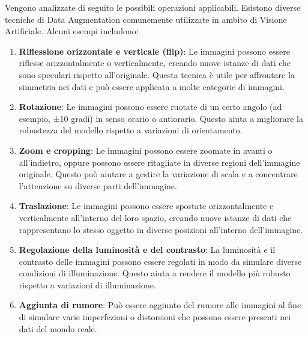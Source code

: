 \documentclass[12pt,a4paper,openright,twoside]{book}
\begin{document}
Vengono analizzate di seguito le possibili operazioni applicabili. Esistono diverse tecniche di Data Augmentation comunemente utilizzate in ambito di Visione Artificiale. Alcuni esempi includono:
\begin{enumerate}
\item \textbf{Riflessione orizzontale e verticale (flip)}: Le immagini possono essere riflesse orizzontalmente o verticalmente, creando nuove istanze di dati che sono speculari rispetto all'originale. Questa tecnica è utile per affrontare la simmetria nei dati e può essere applicata a molte categorie di immagini.

\item \textbf{Rotazione}: Le immagini possono essere ruotate di un certo angolo (ad esempio, ±10 gradi) in senso orario o antiorario. Questo aiuta a migliorare la robustezza del modello rispetto a variazioni di orientamento.

\item \textbf{Zoom e cropping}: Le immagini possono essere zoomate in avanti o all'indietro, oppure possono essere ritagliate in diverse regioni dell'immagine originale. Questo può aiutare a gestire la variazione di scala e a concentrare l'attenzione su diverse parti dell'immagine.

\item \textbf{Traslazione}: Le immagini possono essere spostate orizzontalmente e verticalmente all'interno del loro spazio, creando nuove istanze di dati che rappresentano lo stesso oggetto in diverse posizioni all'interno dell'immagine.

\item \textbf{Regolazione della luminosità e del contrasto}: La luminosità e il contrasto delle immagini possono essere regolati in modo da simulare diverse condizioni di illuminazione. Questo aiuta a rendere il modello più robusto rispetto a variazioni di illuminazione.

\item \textbf{Aggiunta di rumore}: Può essere aggiunto del rumore alle immagini al fine di simulare varie imperfezioni o distorsioni che possono essere presenti nei dati del mondo reale.
\end{enumerate}
\end{document}
